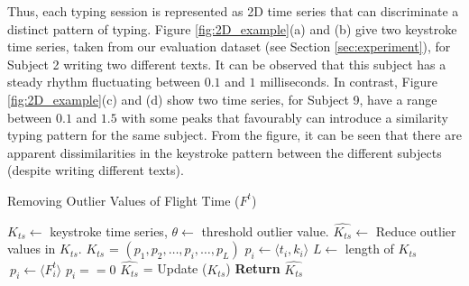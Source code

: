 \documentclass[runningheads,a4paper]{llncs}
\begin{document}
Thus, each typing session is represented as 2D time series that can discriminate a distinct pattern of typing. Figure \ref{fig:2D_example}(a) and (b) give two keystroke time series, taken from our evaluation dataset (see Section \ref{sec:experiment}), for Subject 2 writing two different texts. It can be observed that this subject has a steady rhythm fluctuating between $0.1$ and $1$ milliseconds. In contrast, Figure \ref{fig:2D_example}(c) and (d) show two time series, for Subject 9, have a range between $0.1$ and $1.5$ with some peaks that favourably can introduce a similarity typing pattern for the same subject. From the figure, it can be seen that there are apparent dissimilarities in the keystroke pattern between the different subjects (despite writing different texts).

\begin{algorithm}
\caption{Removing Outlier Values of Flight Time ($F^t$)}
\label{alg:removeOutlierValues}
\begin{algorithmic}[1]
\Require $K_{ts}\leftarrow$ keystroke time series, $\theta \leftarrow$ threshold outlier value. 
\Ensure $\widehat{K_{ts}}\leftarrow$ Reduce outlier values in $K_{ts}$. 
        \State $K_{ts}$ = $(p_1,p_2,\dots,p_i,\dots,p_L)$ 
        \State $p_i \leftarrow \langle t_i, k_i \rangle$  
        \State $L \leftarrow$ length of $K_{ts}$
                    \State $\ p_i \leftarrow \langle F^t_i \rangle$  
                    \State $p_i == 0$
                        \State $\widehat{K_{ts}}$ = Update ($K_{ts}$)
                \EndIf 
            \EndFor
         \EndFor
        \State \textbf{Return} $\widehat{K_{ts}}$
 
\end{algorithmic}
\end{algorithm}

\end{document}
